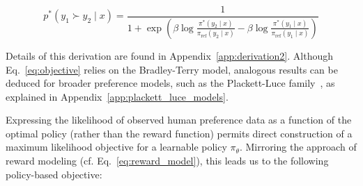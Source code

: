 \begin{equation}\label{eq:objective}
    p^*(y_1\succ y_2 \mid x)=\frac{1}{1 + \exp\left(\beta \log \frac{\pi^*(y_2\mid x)}{\pi_\text{ref}(y_2\mid x)} - \beta \log \frac{\pi^*(y_1\mid x)}{\pi_\text{ref}(y_1\mid x)}\right)}
\end{equation}

Details of this derivation are found in Appendix~\ref{app:derivation2}. Although Eq.~\ref{eq:objective} relies on the Bradley-Terry model, analogous results can be deduced for broader preference models, such as the Plackett-Luce family~\citep{plackett1975analysis, luce2012individual}, as explained in Appendix~\ref{app:plackett_luce_models}.

Expressing the likelihood of observed human preference data as a function of the optimal policy (rather than the reward function) permits direct construction of a maximum likelihood objective for a learnable policy $\pi_\theta$. Mirroring the approach of reward modeling (cf. Eq.~\ref{eq:reward_model}), this leads us to the following policy-based objective:

